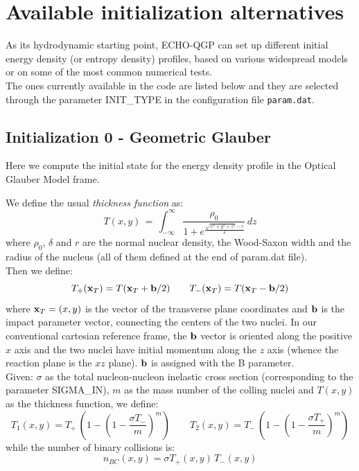 \chapter{Available initialization alternatives}\label{sec:test}
As its hydrodynamic starting point, ECHO-QGP can set up different initial energy density (or entropy density) profiles, based on various widespread models or on some of the most common numerical tests. \\
The ones currently available in the code are listed below and they are selected through the parameter INIT\_TYPE in the configuration file {\tt param.dat}.

\section{Initialization 0 - Geometric Glauber}
Here we compute the initial state for the energy density profile in the Optical Glauber Model frame\cite{Glauber}. 

We define the usual \textit{thickness function}  as:
\begin{displaymath}
T(x,y)\,=\,\int_{-\infty}^{\infty}\frac{\rho_0} {1+e^{\frac {\sqrt {x^2+y^2+z^2}- r}{\delta}}}\,dz
\end{displaymath}
where $\rho_0$, $\delta$ and $r$ are the normal nuclear density, the Wood-Saxon width and the radius of the nucleus (all of them defined at the end of param.dat file).\\
Then we define:
\begin{displaymath}
T_+({\bf x}_T) = T({\bf x}_T+{\bf b}/2)\qquad T_-({\bf x}_T) = T({\bf x}_T-{\bf b}/2)
\end{displaymath}
where ${\bf x}_T=(x,y)$ is the vector of the transverse plane coordinates and 
${\bf b}$ is the impact parameter vector, connecting the centers of the two nuclei. 
In our conventional cartesian reference frame, the ${\bf b}$ vector is oriented along 
the positive $x$ axis and the two nuclei have initial momentum along the $z$ axis 
(whence the reaction plane is the $xz$ plane). ${\bf b}$ is assigned with the B parameter.\\
Given: $\sigma$ as the total nucleon-nucleon inelastic cross section (corresponding to the parameter SIGMA\_IN), $m$ as the mass number of the colling nuclei and $T(x,y)$ as the thickness function, we define:
\begin{displaymath}
T_1(x,y)=T_+\,\left (1-\left ( 1-\dfrac{\sigma T_-}{m}\right )^m \right )\qquad
T_2(x,y)=T_-\,\left (1-\left (1-\dfrac{\sigma T_+}{m}\right )^m \right )
\end{displaymath}
while the number of binary collisions is:
\begin{displaymath}
n_{BC}(x,y)=\sigma T_+(x,y)\,T_-(x,y)
\end{displaymath}

